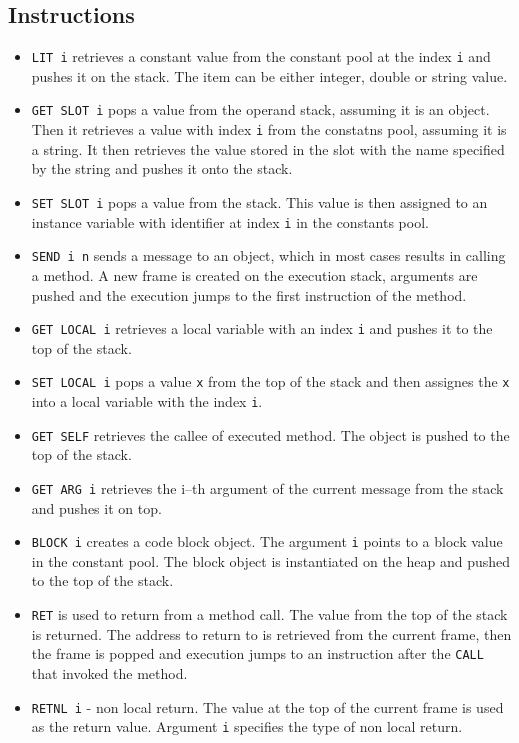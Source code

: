 \documentclass[thesis=M,english]{FITthesis}[2019/12/23]
\begin{document}
\subsection{Instructions}
\begin{itemize}
	\item \texttt{LIT i} retrieves a constant value from the constant pool at the index \texttt{i} and pushes it
		on the stack. The item can be either integer, double or string value.
	\item \texttt{GET SLOT i} pops a value from the operand stack, assuming it is an object. Then it retrieves a value
		with index \texttt{i} from the constatns pool, assuming it is a string. It then retrieves the value
		stored in the slot with the name specified by the string and pushes it onto the stack.
	\item \texttt{SET SLOT i} pops a value from the stack. This value is then assigned to an instance variable with identifier
		at index \texttt{i} in the constants pool.
	\item \texttt{SEND i n} sends a message to an object, which in most cases results in calling a method. A new frame
		is created on the execution stack, arguments are pushed and the execution jumps to the first instruction of the
		method.
	\item \texttt{GET LOCAL i} retrieves a local variable with an index \texttt{i} and pushes it to the top of the stack.
	\item \texttt{SET LOCAL i} pops a value \texttt{x} from the top of the stack and then assignes the \texttt{x} into
		a local variable with the index \texttt{i}.
	\item \texttt{GET SELF} retrieves the callee of executed method. The object is pushed to the top of the stack.
	\item \texttt{GET ARG i} retrieves the i--th argument of the current message from the stack and pushes it on top.
	\item \texttt{BLOCK i} creates a code block object. The argument \texttt{i} points to a block value in the constant pool.
		The block object is instantiated on the heap and pushed to the top of the stack.
	\item \texttt{RET} is used to return from a method call. The value from the top of the stack is returned. The address
		to return to is retrieved from the current frame, then the frame is popped and execution jumps to an instruction
		after the \texttt{CALL} that invoked the method.
	\item \texttt{RETNL i} - non local return. The value at the top of the current frame is used as the return value. Argument
		\texttt{i} specifies the type of non local return.
\end{itemize}
\end{document}
